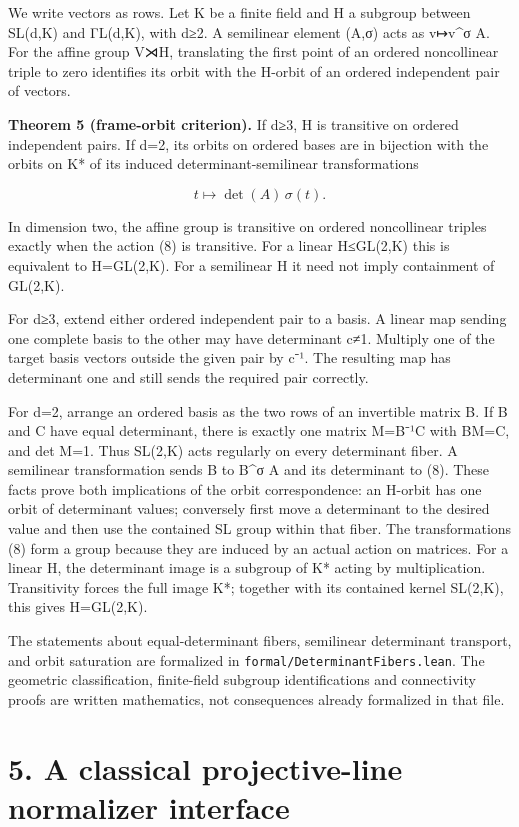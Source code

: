 We write vectors as rows. Let K be a finite field and H a subgroup
between SL(d,K) and ΓL(d,K), with d≥2. A semilinear element (A,σ) acts
as v↦v\^{}σ A. For the affine group V⋊H, translating the first point of
an ordered noncollinear triple to zero identifies its orbit with the
H-orbit of an ordered independent pair of vectors.

\textbf{Theorem 5 (frame-orbit criterion).} If d≥3, H is transitive on
ordered independent pairs. If d=2, its orbits on ordered bases are in
bijection with the orbits on K* of its induced determinant-semilinear
transformations

\[
 t\longmapsto \det(A)\,\sigma(t).
\tag{8}
\]

In dimension two, the affine group is transitive on ordered noncollinear
triples exactly when the action (8) is transitive. For a linear
H≤GL(2,K) this is equivalent to H=GL(2,K). For a semilinear H it need
not imply containment of GL(2,K).

For d≥3, extend either ordered independent pair to a basis. A linear map
sending one complete basis to the other may have determinant c≠1.
Multiply one of the target basis vectors outside the given pair by c⁻¹.
The resulting map has determinant one and still sends the required pair
correctly.

For d=2, arrange an ordered basis as the two rows of an invertible
matrix B. If B and C have equal determinant, there is exactly one matrix
M=B⁻¹C with BM=C, and det M=1. Thus SL(2,K) acts regularly on every
determinant fiber. A semilinear transformation sends B to B\^{}σ A and
its determinant to (8). These facts prove both implications of the orbit
correspondence: an H-orbit has one orbit of determinant values;
conversely first move a determinant to the desired value and then use
the contained SL group within that fiber. The transformations (8) form a
group because they are induced by an actual action on matrices. For a
linear H, the determinant image is a subgroup of K* acting by
multiplication. Transitivity forces the full image K*; together with its
contained kernel SL(2,K), this gives H=GL(2,K).

The statements about equal-determinant fibers, semilinear determinant
transport, and orbit saturation are formalized in
\texttt{formal/DeterminantFibers.lean}. The geometric
classification, finite-field subgroup identifications and connectivity
proofs are written mathematics, not consequences already formalized in
that file.

\section{5. A classical projective-line normalizer
interface}\label{a-classical-projective-line-normalizer-interface}

